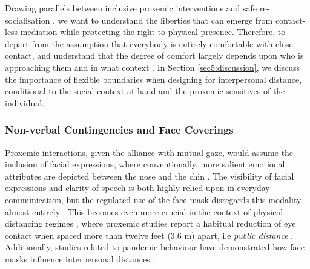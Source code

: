 Drawing parallels between inclusive proxemic interventions and safe re-socialisation \citep{long_covid-19_2021}, we want to understand the liberties that can emerge from contact-less mediation while protecting the right to physical presence. Therefore, to depart from the assumption that everybody is entirely comfortable with close contact, and understand that the degree of comfort largely depends upon who is approaching them and in what context \citep{matsumoto_gender_2016,suvilehto_topography_2015}. In Section \ref{sec5:discussion}, we discuss the importance of flexible boundaries when designing for interpersonal distance, conditional to the social context at hand and the proxemic sensitives of the individual.

\subsubsection{Non-verbal Contingencies and Face Coverings}
\label{subsev:face_coverings}

Proxemic interactions, given the alliance with mutual gaze, would assume the inclusion of facial expressions, where conventionally, more salient emotional attributes are depicted between the nose and the chin \citep{fischer_veiled_2012,blais_eyes_2012}. The visibility of facial expressions and clarity of speech is both highly relied upon in everyday communication, but the regulated use of the face mask disregards this modality almost entirely \citep{carbon_wearing_2020}. This becomes even more crucial in the context of physical distancing regimes \citep{campagne_problem_2021}, where proxemic studies report a habitual reduction of eye contact when spaced more than twelve feet (3.6 m) apart, i.e \textit{public distance} \citep{baldassare_cultural_1975}. Additionally, studies related to pandemic behaviour have demonstrated how face masks influence interpersonal distances \cite{cartaud_wearing_2020}.

